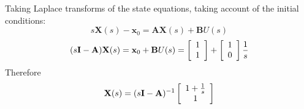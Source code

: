 Taking Laplace transforms of the state equations, taking account of the initial conditions:
\[
s\mathbf{X}(s)-\mathbf{x}_0=\mathbf{A}\mathbf{X}(s)+\mathbf{B}U(s)
\]
\[
(s{\bf{I}} - {\bf{A}}){\bf{X}}(s) = {\bf{x}}_0  + {\bf{B}}U(s) = \left[ {\begin{array}{*{20}c}
   1  \\
   1  \\
\end{array}} \right] + \left[ {\begin{array}{*{20}c}
   1  \\
   0  \\
\end{array}} \right]\frac{1}{s}
\]
Therefore
\[
{\bf{X}}(s) = (s{\bf{I}} - {\bf{A}})^{ - 1} \left[ {\begin{array}{*{20}c}
   {1 + \frac{1}{s}}  \\
   1  \\
\end{array}} \right]
\]

